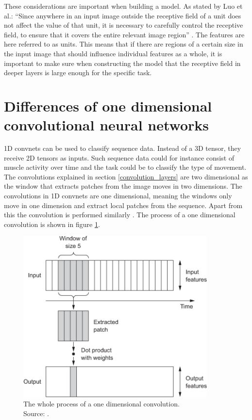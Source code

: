 These considerations are important when building a model. As stated by Luo et al.: \enquote{Since anywhere in an input image outside the receptive field of a unit does not affect the value of that unit, it is necessary to carefully control the receptive field, to ensure that it covers the entire relevant image region} \cite[p.~1]{receptive}. The features are here referred to as units. This means that if there are regions of a certain size in the input image that should influence individual features as a whole, it is important to make sure when constructing the model that the receptive field in deeper layers is large enough for the specific task.

\newpage

\section{Differences of one dimensional \\convolutional neural networks}
\label{differences_1d_2d}
1D convnets can be used to classify sequence data. Instead of a 3D tensor, they receive 2D tensors as inputs. Such sequence data could for instance consist of muscle activity over time and the task could be to classify the type of movement. The convolutions explained in section \ref{convolution_layers}  are two dimensional as the window that extracts patches from the image moves in two dimensions. The convolutions in 1D convnets are one dimensional, meaning the windows only move in one dimension and extract local patches from the sequence. Apart from this the convolution is performed similarly \cite[Chapter~6]{cnn}. The process of a one dimensional convolution is shown in figure \ref{fig:conv1d}. 
\begin{figure}[H]
	\centering
	\includegraphics[width=10cm]{images/nn/conv1d.jpg}
	\caption[The whole process of a one dimensional convolution.]{The whole process of a one dimensional convolution. \\Source: \cite[Chapter~6]{cnn}.}
	\label{fig:conv1d}
\end{figure}


